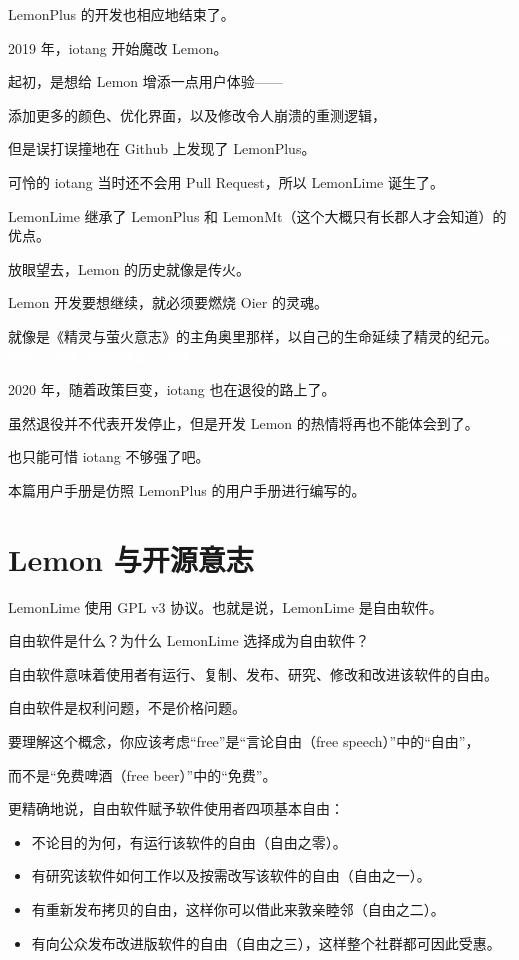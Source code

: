 \documentclass[UTF-8]{ctexart}
\begin{document}
		LemonPlus 的开发也相应地结束了。\newline
		
		2019 年，iotang 开始魔改 Lemon。
		
		起初，是想给 Lemon 增添一点用户体验——
		
		添加更多的颜色、优化界面，以及修改令人崩溃的重测逻辑，
		
		但是误打误撞地在 Github 上发现了 LemonPlus。
		
		可怜的 iotang 当时还不会用 Pull Request，所以 LemonLime 诞生了。
		
		LemonLime 继承了 LemonPlus 和 LemonMt（这个大概只有长郡人才会知道）的优点。\newline
		
		放眼望去，Lemon 的历史就像是传火。
		
		Lemon 开发要想继续，就必须要燃烧 Oier 的灵魂。
		
		就像是《精灵与萤火意志》的主角奥里那样，以自己的生命延续了精灵的纪元。\textcolor{white}{虽然这一作整个剧情就是一坨屎。}
		
		2020 年，随着政策巨变，iotang 也在退役的路上了。
		
		虽然退役并不代表开发停止，但是开发 Lemon 的热情将再也不能体会到了。
		
		也只能可惜 iotang 不够强了吧。\newline
		
		本篇用户手册是仿照 LemonPlus 的用户手册进行编写的。
		
	\newpage
	
	\section{Lemon 与开源意志}
		
		LemonLime 使用 GPL v3 协议。也就是说，LemonLime 是自由软件。\newline
		
		自由软件是什么？为什么 LemonLime 选择成为自由软件？
		
		自由软件意味着使用者有运行、复制、发布、研究、修改和改进该软件的自由。
		
		自由软件是权利问题，不是价格问题。
		
		要理解这个概念，你应该考虑“free”是“言论自由（free speech）”中的“自由”，
		
		而不是“免费啤酒（free beer）”中的“免费”。\newline
		
		更精确地说，自由软件赋予软件使用者四项基本自由：
		
		\begin{itemize}
			\item 不论目的为何，有运行该软件的自由（自由之零）。
			\item 有研究该软件如何工作以及按需改写该软件的自由（自由之一）。
			\item 有重新发布拷贝的自由，这样你可以借此来敦亲睦邻（自由之二）。
			\item 有向公众发布改进版软件的自由（自由之三），这样整个社群都可因此受惠。
		\end{itemize}
	
\end{document}
